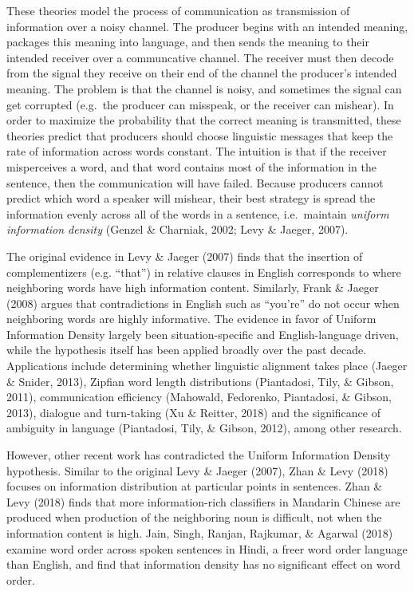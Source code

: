 \documentclass[10pt, letterpaper]{article}
\begin{document}
These theories model the process of communication as transmission of
information over a noisy channel. The producer begins with an intended
meaning, packages this meaning into language, and then sends the meaning
to their intended receiver over a communcative channel. The receiver
must then decode from the signal they receive on their end of the
channel the producer's intended meaning. The problem is that the channel
is noisy, and sometimes the signal can get corrupted (e.g.~the producer
can misspeak, or the receiver can mishear). In order to maximize the
probability that the correct meaning is transmitted, these theories
predict that producers should choose linguistic messages that keep the
rate of information across words constant. The intuition is that if the
receiver misperceives a word, and that word contains most of the
information in the sentence, then the communication will have failed.
Because producers cannot predict which word a speaker will mishear,
their best strategy is spread the information evenly across all of the
words in a sentence, i.e.~maintain \emph{uniform information density}
(Genzel \& Charniak, 2002; Levy \& Jaeger, 2007).

The original evidence in Levy \& Jaeger (2007) finds that the insertion
of complementizers (e.g. ``that'') in relative clauses in English
corresponds to where neighboring words have high information content.
Similarly, Frank \& Jaeger (2008) argues that contradictions in English
such as ``you're'' do not occur when neighboring words are highly
informative. The evidence in favor of Uniform Information Density
largely been situation-specific and English-language driven, while the
hypothesis itself has been applied broadly over the past decade.
Applications include determining whether linguistic alignment takes
place (Jaeger \& Snider, 2013), Zipfian word length distributions
(Piantadosi, Tily, \& Gibson, 2011), communication efficiency (Mahowald,
Fedorenko, Piantadosi, \& Gibson, 2013), dialogue and turn-taking (Xu \&
Reitter, 2018) and the significance of ambiguity in language
(Piantadosi, Tily, \& Gibson, 2012), among other research.

However, other recent work has contradicted the Uniform Information
Density hypothesis. Similar to the original Levy \& Jaeger (2007), Zhan
\& Levy (2018) focuses on information distribution at particular points
in sentences. Zhan \& Levy (2018) finds that more information-rich
classifiers in Mandarin Chinese are produced when production of the
neighboring noun is difficult, not when the information content is high.
Jain, Singh, Ranjan, Rajkumar, \& Agarwal (2018) examine word order
across spoken sentences in Hindi, a freer word order language than
English, and find that information density has no significant effect on
word order.
\end{document}
